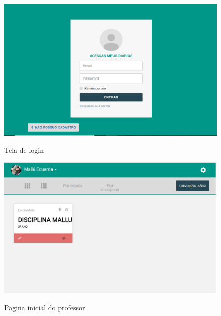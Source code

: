 \begin{figure}[!htb]
	\centering
	\caption{Tela de login} %
	\includegraphics[scale=0.4]{loginTela}\\  %
	{\small } %
	\label{fig:loginTela} %
\end{figure}

\begin{figure}[!htb]
	\centering
	\caption{Pagina inicial do professor} %
	\includegraphics[scale=0.4]{telaInicio}\\  %
	{\small } %
	\label{fig:telaInicio} %
\end{figure}



